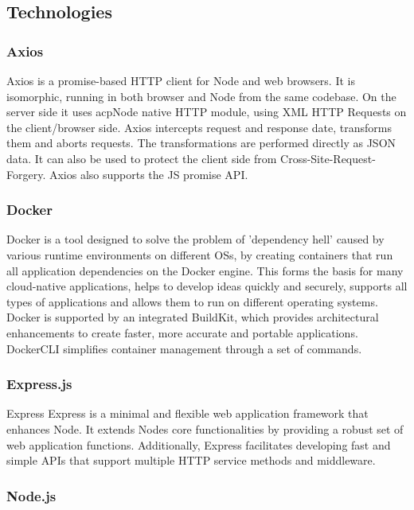 \documentclass[
a4paper,
11pt
]{article}
\begin{document}
	\subsection{Technologies}
	
	\subsubsection{Axios}
	Axios is a promise-based \ac{HTTP} client for \ac{Node} and web browsers. It is isomorphic, running in both browser and Node from the same codebase. On the server side it uses acp{Node} native \ac{HTTP} module, using \ac{XML} \ac{HTTP} Requests on the client/browser side. Axios intercepts request and response date, transforms them and aborts requests. The transformations are performed directly as \ac{JSON} data. It can also be used to protect the client side from Cross-Site-Request-Forgery. Axios also supports the \ac{JS} promise \ac{API}.\cite{noauthor_getting_nodate}
	\subsubsection{Docker}
	
	Docker is a tool designed to solve the problem of 'dependency hell' caused by various runtime environments on different \acp{OS}, by creating containers that run all application dependencies on the Docker engine. This forms the basis for many cloud-native applications, helps to develop ideas quickly and securely, supports all types of applications and allows them to run on different operating systems. Docker is supported by an integrated BuildKit, which provides architectural enhancements to create faster, more accurate and portable applications. DockerCLI simplifies container management through a set of commands.\cite{noauthor_industry-leading_2021}
	
	\subsubsection{Express.js}
	\ac{Express} \ac{Express} is a minimal and flexible web application framework that enhances \ac{Node}. It extends \acp{Node} core functionalities by providing a robust set of web application functions. Additionally, Express facilitates developing fast and simple \acp{API} that support multiple \ac{HTTP} service methods and middleware.\cite{noauthor_express_nodate}
	
	\subsubsection{Node.js}
	
\end{document}
